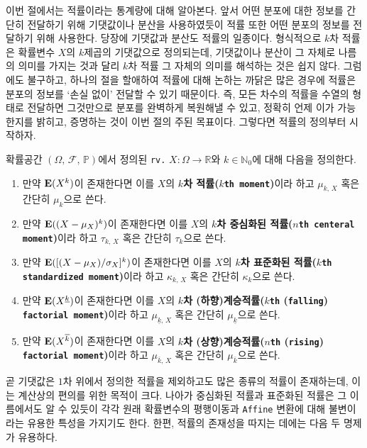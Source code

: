 이번 절에서는 적률이라는 통계량에 대해 알아본다. 앞서 어떤 분포에 대한 정보를 간단히 전달하기 위해 기댓값이나 분산을 사용하였듯이 적률 또한 어떤 분포의 정보를 전달하기 위해 사용한다. 당장에 기댓값과 분산도 적률의 일종이다. 형식적으로 $k$차 적률은 확률변수 $X$의 $k$제곱의 기댓값으로 정의되는데, 기댓값이나 분산이 그 자체로 나름의 의미를 가지는 것과 달리 $k$차 적률 그 자체의 의미를 해석하는 것은 쉽지 않다. 그럼에도 불구하고, 하나의 절을 할애하여 적률에 대해 논하는 까닭은 많은 경우에 적률은 분포의 정보를 `손실 없이' 전달할 수 있기 때문이다. 즉, 모든 차수의 적률을 수열의 형태로 전달하면 그것만으로 분포를 완벽하게 복원해낼 수 있고, 정확히 언제 이가 가능한지를 밝히고, 증명하는 것이 이번 절의 주된 목표이다. 그렇다면 적률의 정의부터 시작하자.

\begin{definition}
    확률공간 $(\Omega,\,\mathcal{F},\,\mathbb{P})$에서 정의된 \texttt{rv.} $X:\Omega\to\mathbb{R}$와 $k\in\mathbb{N}_0$에 대해 다음을 정의한다.
    \begin{enumerate}
        \item 만약 $\mathbf{E}(X^k)$이 존재한다면 이를 $X$의 \textbf{$k$차 적률($k$\texttt{th moment})}이라 하고 $\mu_{k,\,X}$ 혹은 간단히 $\mu_k$으로 쓴다.
        \item 만약 $\mathbf{E}((X-\mu_X)^k)$이 존재한다면 이를 $X$의 \textbf{$k$차 중심화된 적률($n$\texttt{th centeral moment})}이라 하고 $\tau_{k,\,X}$ 혹은 간단히 $\tau_k$으로 쓴다.
        \item 만약 $\mathbf{E}([(X-\mu_X)/\sigma_X]^k)$이 존재한다면 이를 $X$의 \textbf{$k$차 표준화된 적률($k$\texttt{th standardized moment})}이라 하고 $\kappa_{k,\,X}$ 혹은 간단히 $\kappa_k$으로 쓴다.
        \item 만약 $\mathbf{E}(X^{\underline{k}})$이 존재한다면 이를 $X$의 \textbf{$k$차 (하향)계승적률($k$\texttt{th} (\texttt{falling}) \texttt{factorial moment})}이라 하고 $\mu_{\underline{k},\,X}$ 혹은 간단히 $\mu_{\underline{k}}$으로 쓴다.
        \item 만약 $\mathbf{E}(X^{\overline{k}})$이 존재한다면 이를 $X$의 \textbf{$k$차 (상향)계승적률($n$\texttt{th} (\texttt{rising}) \texttt{factorial moment})}이라 하고 $\mu_{\overline{k},\,X}$ 혹은 간단히 $\mu_{\overline{k}}$으로 쓴다.
    \end{enumerate}
\end{definition}

곧 기댓값은 $1$차 위에서 정의한 적률을 제외하고도 많은 종류의 적률이 존재하는데, 이는 계산상의 편의를 위한 목적이 크다. 나아가 중심화된 적률과 표준화된 적률은 그 이름에서도 알 수 있듯이 각각 원래 확률변수의 평행이동과 \texttt{Affine} 변환에 대해 불변이라는 유용한 특성을 가지기도 한다. 한편, 적률의 존재성을 따지는 데에는 다음 두 명제가 유용하다.

